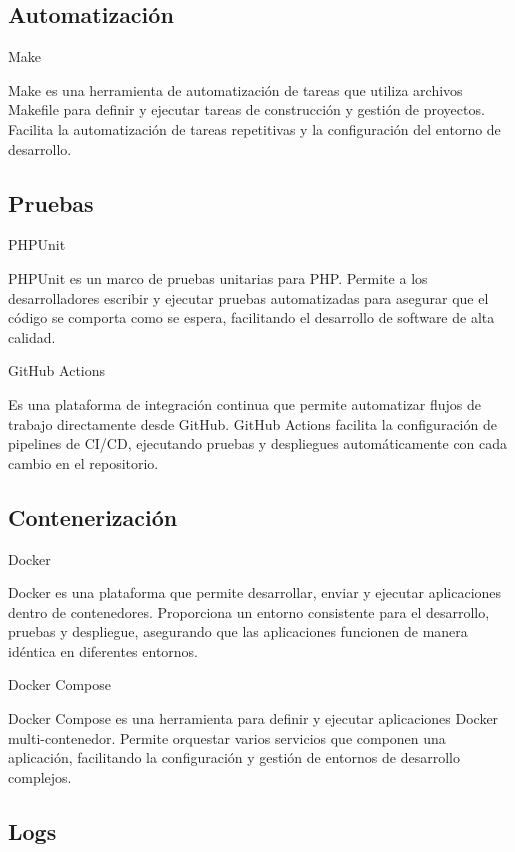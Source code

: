 \subsection{Automatización}

Make

Make es una herramienta de automatización de tareas que utiliza archivos Makefile para definir y ejecutar tareas de
construcción y gestión de proyectos.
Facilita la automatización de tareas repetitivas y la configuración del entorno de desarrollo.

\subsection{Pruebas}

PHPUnit

PHPUnit es un marco de pruebas unitarias para PHP. Permite a los desarrolladores escribir y ejecutar pruebas
automatizadas
para asegurar que el código se comporta como se espera, facilitando el desarrollo de software de alta calidad.

GitHub Actions

Es una plataforma de integración continua que permite automatizar flujos de trabajo directamente desde GitHub.
GitHub Actions facilita la configuración de pipelines de CI/CD, ejecutando pruebas y despliegues automáticamente con
cada cambio en el repositorio.

\subsection{Contenerización}

Docker

Docker es una plataforma que permite desarrollar, enviar y ejecutar aplicaciones dentro de
contenedores.
Proporciona un entorno consistente para el desarrollo, pruebas y despliegue, asegurando que las aplicaciones funcionen
de manera idéntica en diferentes entornos.

Docker Compose

Docker Compose es una herramienta para definir y ejecutar aplicaciones Docker multi-contenedor.
Permite orquestar varios servicios que componen una aplicación, facilitando
la configuración y gestión de entornos de desarrollo complejos.

\subsection{Logs}

